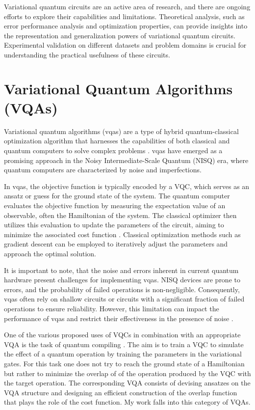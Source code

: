 \documentclass[inscr,ack,preface]{diphdthesis}
\begin{document}
Variational quantum circuits are  an active area of research, and there are ongoing efforts to explore their capabilities and limitations. Theoretical analysis, such as error performance analysis and optimization properties, can provide insights into the representation and generalization powers of variational quantum circuits. Experimental validation on different datasets and problem domains is crucial for understanding the practical usefulness of these circuits.

\section{Variational Quantum Algorithms (VQAs)}

Variational quantum algorithms (\acrshort{vqa}s) are a type of hybrid quantum-classical optimization algorithm that harnesses the capabilities of both classical and quantum computers to solve complex problems \cite{vqa}. \acrshort{vqa}s have emerged as a promising approach in the Noisy Intermediate-Scale Quantum (NISQ) era, where quantum computers are characterized by noise and imperfections.

In \acrshort{vqa}s, the objective function is typically encoded by a VQC, which serves as an ansatz or guess for the ground state of the system. The quantum computer evaluates the objective function by measuring the expectation value of an observable, often the Hamiltonian of the system. The classical optimizer then utilizes this evaluation to update the parameters of the circuit, aiming to minimize the associated cost function \cite{vqa}. Classical optimization methods such as gradient descent can be employed to iteratively adjust the parameters and approach the optimal solution.

It is important to note, that the noise and errors inherent in current quantum hardware present challenges for implementing \acrshort{vqa}s. NISQ devices are prone to errors, and the probability of failed operations is non-negligible. Consequently, \acrshort{vqa}s often rely on shallow circuits or circuits with a significant fraction of failed operations to ensure reliability. However, this limitation can impact the performance of \acrshort{vqa}s and restrict their effectiveness in the presence of noise \cite{limitations}.

One of the various proposed uses of VQCs in combination with an appropriate VQA is the task of quantum compiling \cite{paper}. The aim is to train a VQC to simulate the effect of a quantum operation by training the parameters in the variational gates. For this task one does not try to reach the ground state of a Hamiltonian but rather to minimize the overlap of of the operation produced by the VQC with the target operation. The corresponding VQA consists of devising ansatzes on the VQA structure and designing an efficient construction of the overlap function that plays the role of the cost function. My work falls into this category of VQAs. 
\end{document}
